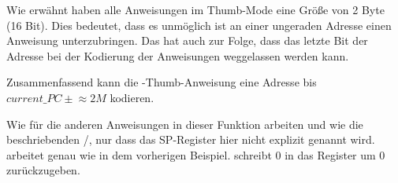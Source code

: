 Wie erwähnt haben alle Anweisungen im Thumb-Mode eine Größe von 2 Byte (16 Bit).
Dies bedeutet, dass es unmöglich ist an einer ungeraden Adresse einen Anweisung unterzubringen.
Das hat auch zur Folge, dass das letzte Bit der Adresse bei der Kodierung der
Anweisungen weggelassen werden kann.

Zusammenfassend kann die -Thumb-Anweisung eine Adresse bis $current\_PC \pm{}\approx{}2M$ kodieren.

Wie für die anderen Anweisungen in dieser Funktion arbeiten \PUSH und \POP wie die beschriebenden /,
nur dass das \ac{SP}-Register hier nicht explizit genannt wird.
 arbeitet genau wie in dem vorherigen Beispiel.
 schreibt 0 in das Register  um 0 zurückzugeben.
